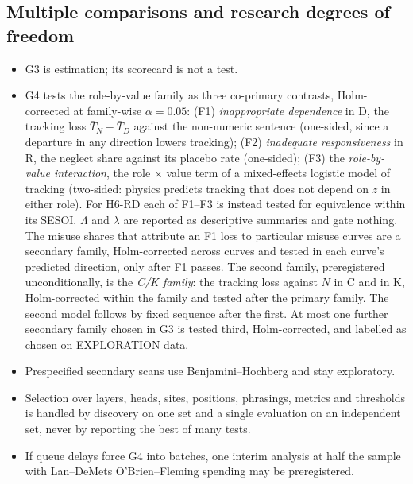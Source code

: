\documentclass[10pt,a4paper]{article}
\begin{document}
\subsection{Multiple comparisons and research degrees of freedom}
\begin{itemize}
\item G3 is estimation; its scorecard is not a test.
\item G4 tests the role-by-value family as three co-primary contrasts, Holm-corrected at family-wise
$\alpha=0.05$: (F1) \emph{inappropriate dependence} in D, the tracking loss $\bar T_N-\bar T_D$ against the
non-numeric sentence (one-sided, since a departure in any direction lowers tracking); (F2) \emph{inadequate
responsiveness} in R, the neglect share against its placebo rate (one-sided); (F3) the \emph{role-by-value interaction}, the role $\times$ value term of a
mixed-effects logistic model of tracking (two-sided: physics predicts tracking that does not depend on $z$ in either
role). For H6-RD each of F1--F3 is instead tested for equivalence within its SESOI. $\Lambda$ and $\lambda$ are
reported as descriptive summaries and gate nothing. The misuse shares that attribute an F1 loss to particular
misuse curves are a secondary family, Holm-corrected across curves and tested in each curve's predicted direction,
only after F1 passes. The second family, preregistered unconditionally, is the \emph{C/K family}: the tracking loss against $N$ in
C and in K, Holm-corrected within the family and tested after the primary family. The second model follows by fixed sequence after
the first. At most one further secondary family chosen in G3 is tested third, Holm-corrected, and labelled as chosen on
EXPLORATION data.
\item Prespecified secondary scans use Benjamini--Hochberg and stay exploratory.
\item Selection over layers, heads, sites, positions, phrasings, metrics and thresholds is handled by discovery on
one set and a single evaluation on an independent set, never by reporting the best of many tests.
\item If queue delays force G4 into batches, one interim analysis at half the sample with Lan--DeMets
O'Brien--Fleming spending may be preregistered.
\end{itemize}
\end{document}
